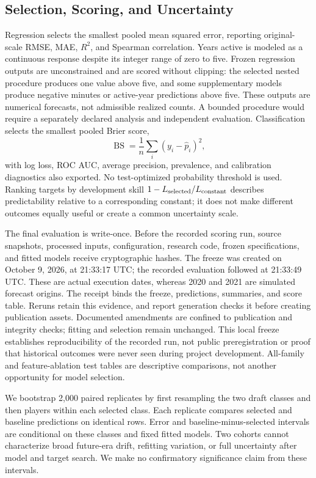 \documentclass[11pt]{article}
\begin{document}
\subsection{Selection, Scoring, and Uncertainty}
Regression selects the smallest pooled mean squared error, reporting original-scale RMSE, MAE, $R^2$, and Spearman correlation. Years active is modeled as a continuous response despite its integer range of zero to five. Frozen regression outputs are unconstrained and are scored without clipping: the selected nested procedure produces one value above five, and some supplementary models produce negative minutes or active-year predictions above five. These outputs are numerical forecasts, not admissible realized counts. A bounded procedure would require a separately declared analysis and independent evaluation. Classification selects the smallest pooled Brier score,
\begin{equation}
\operatorname{BS}=\frac{1}{n}\sum_i(y_i-\widehat p_i)^2,
\end{equation}
with log loss, ROC AUC, average precision, prevalence, and calibration diagnostics also exported. No test-optimized probability threshold is used. Ranking targets by development skill $1-L_{\rm selected}/L_{\rm constant}$ describes predictability relative to a corresponding constant; it does not make different outcomes equally useful or create a common uncertainty scale.

The final evaluation is write-once. Before the recorded scoring run, source snapshots, processed inputs, configuration, research code, frozen specifications, and fitted models receive cryptographic hashes. The freeze was created on October 9, 2026, at 21:33:17 UTC; the recorded evaluation followed at 21:33:49 UTC. These are actual execution dates, whereas 2020 and 2021 are simulated forecast origins. The receipt binds the freeze, predictions, summaries, and score table. Reruns retain this evidence, and report generation checks it before creating publication assets. Documented amendments are confined to publication and integrity checks; fitting and selection remain unchanged. This local freeze establishes reproducibility of the recorded run, not public preregistration or proof that historical outcomes were never seen during project development. All-family and feature-ablation test tables are descriptive comparisons, not another opportunity for model selection.

We bootstrap 2,000 paired replicates by first resampling the two draft classes and then players within each selected class. Each replicate compares selected and baseline predictions on identical rows. Error and baseline-minus-selected intervals are conditional on these classes and fixed fitted models. Two cohorts cannot characterize broad future-era drift, refitting variation, or full uncertainty after model and target search. We make no confirmatory significance claim from these intervals.
\end{document}
